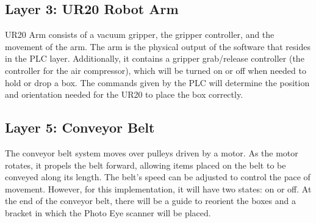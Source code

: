 \subsection{Layer 3: UR20 Robot Arm}
UR20 Arm consists of a vacuum gripper, the gripper controller, and the movement of the arm. The arm is the physical output of the software that resides in the PLC layer. Additionally, it contains a gripper grab/release controller (the controller for the air compressor), which will be turned on or off when needed to hold or drop a box. The commands given by the PLC will determine the position and orientation needed for the UR20 to place the box correctly.

\subsection{Layer 5: Conveyor Belt}
The conveyor belt system moves over pulleys driven by a motor. As the motor rotates, it propels the belt forward, allowing items placed on the belt to be conveyed along its length. The belt's speed can be adjusted to control the pace of movement. However, for this implementation, it will have two states: on or off. At the end of the conveyor belt, there will be a guide to reorient the boxes and a bracket in which the Photo Eye scanner will be placed.